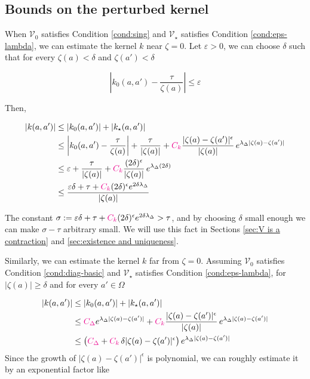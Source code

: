 \documentclass{article}
\theoremstyle{plain}
\newcommand{\hardpart}{\mathcal{V}_0}
\newcommand{\softpart}{\mathcal{V}_\star}
\newcommand{\hardker}{k_0}
\newcommand{\softker}{k_\star}
\begin{document}
\subsection{Bounds on the perturbed kernel}\label{sec:bounds on k}
 When $\hardpart$ satisfies Condition \eqref{cond:sing} and $\softpart$ satisfies Condition \eqref{cond:eps-lambda}, we can estimate the kernel $k$ near $\zeta=0$. Let $\varepsilon>0$, we can choose $\delta$ such that for every $\zeta(a)<\delta$ and $\zeta(a') <\delta$

\[ \left\vert\hardker(a,a')-\frac{\tau}{\zeta(a)} \right\vert \leq \varepsilon\]

Then, 

\begin{align*}
    |k(a,a')|&\leq |\hardker(a,a')| + |\softker(a,a')|\\
    &\leq \left\vert\hardker(a,a')-\frac{\tau}{\zeta(a)} \right\vert +\frac{\tau}{|\zeta(a)|} +\textcolor{magenta}{C_k}\frac{|\zeta(a)-\zeta(a')|^\epsilon}{|\zeta(a)|}\,e^{\lambda_\Delta|\zeta(a)-\zeta(a')|}\\
    &\leq \varepsilon +\frac{\tau}{|\zeta(a)|} + \textcolor{magenta}{C_k}\frac{(2\delta)^\epsilon}{|\zeta(a)|}\,e^{\lambda_\Delta (2\delta)}\\
    &\leq \frac{\varepsilon\delta+\tau+ \textcolor{magenta}{C_k} (2\delta)^\epsilon e^{2\delta \lambda_\Delta} }{|\zeta(a)|}
\end{align*}

The constant $\sigma:=\varepsilon\delta+\tau+ \textcolor{magenta}{C_k} (2\delta)^\epsilon e^{2\delta \lambda_\Delta} > \tau $, and by choosing $\delta$ small enough we can make $\sigma-\tau$ arbitrary small. We will use this fact in Sections \ref{sec:V is a contraction} and \ref{sec:existence and uniqueness}.

Similarly, we can estimate the kernel $k$ far from $\zeta=0$. Assuming $\hardpart$ satisfies Condition \eqref{cond:diag-basic} and $\softpart$ satisfies Condition \eqref{cond:eps-lambda}, for $|\zeta(a)|\geq \delta$ and for every $a'\in\Omega$

\begin{align*}
    |k(a,a')|&\leq |\hardker(a,a')| + |\softker(a,a')|\\
    &\leq \textcolor{magenta}{C_\Delta} e^{\lambda_\Delta |\zeta(a)-\zeta(a')|} +\textcolor{magenta}{C_k}\frac{|\zeta(a)-\zeta(a')|^\epsilon}{|\zeta(a)|}\,e^{\lambda_\Delta|\zeta(a)-\zeta(a')|}\\
    &\leq \big(\textcolor{magenta}{C_\Delta} + \textcolor{magenta}{C_k}\, \delta |\zeta(a)-\zeta(a')|^\epsilon \big) \, e^{\lambda_\Delta|\zeta(a)-\zeta(a')|}
\end{align*}
Since the growth of $|\zeta(a)-\zeta(a')|^\epsilon$ is polynomial, we can roughly estimate it by an exponential factor like 
\end{document}
